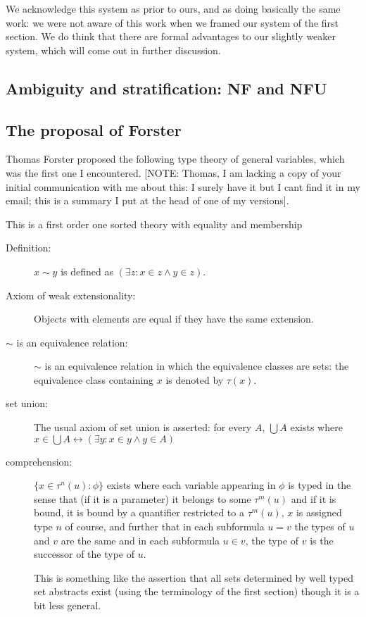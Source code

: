 \documentclass[12pt]{article}
\begin{document}
We acknowledge this system as prior to ours, and as doing basically the same work:  we were not aware of this work when we framed our system of the first section.  We do think that there are formal advantages to our slightly weaker system, which will come out in further discussion.

\subsection{Ambiguity and stratification:  NF and NFU}

\subsection{The proposal of Forster}

Thomas Forster proposed the following type theory of general variables, which was the first one I encountered.  [NOTE:  Thomas, I am lacking a copy of your initial communication with me about this:  I surely have it but I cant find it in my email;  this is a summary I put at the head of one of my versions].

This is a first order one sorted theory with equality and membership

\begin{description}

\item[Definition:]  $x \sim y$ is defined as $(\exists z:x \in z \wedge y \in z)$.

\item[Axiom of weak extensionality:]  Objects with elements are equal if they have the same extension.

\item[$\sim$ is an equivalence relation:]  $\sim$ is an equivalence relation in which the equivalence classes are sets:  the equivalence class containing $x$ is denoted by $\tau(x)$.

\item[set union:]  The usual axiom of set union is asserted:  for every $A$, $\bigcup A$ exists where $x \in \bigcup A \leftrightarrow (\exists y:x \in y \wedge y \in A)$

\item[comprehension:]  $\{x \in \tau^n(u):\phi\}$ exists
where each variable appearing in $\phi$ is typed in the sense that
(if it is a parameter) it belongs to some $\tau^m(u)$ and if it is bound, it is bound by a quantifier restricted to a $\tau^m(u)$, $x$ is assigned type $n$ of course, and further that in each subformula $u=v$ the types of $u$ and $v$ are the same and in each subformula $u \in v$, the type of $v$ is the successor of the type of $u$.

This is something like the assertion that all sets determined by well typed set abstracts exist (using the terminology of the first section) though it is a bit less general.


\end{description}
\end{document}
